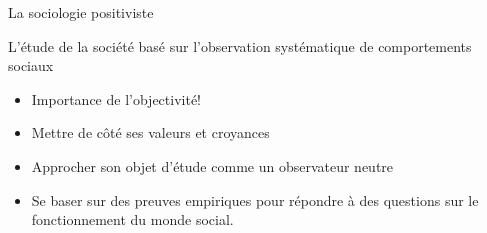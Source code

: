 \documentclass[10pt]{beamer}
\begin{document}
\begin{frame}{La sociologie positiviste}
    \begin{block}{L'étude de la société basé sur l'observation systématique de comportements sociaux}
    \end{block}
    \begin{itemize}
        \item Importance de l'objectivité!
        \item Mettre de côté ses valeurs et croyances
        \item Approcher son objet d'étude comme un observateur neutre
        \item Se baser sur des preuves empiriques pour répondre à des questions sur le fonctionnement du monde social.
    \end{itemize}

\end{frame}


\end{document}
